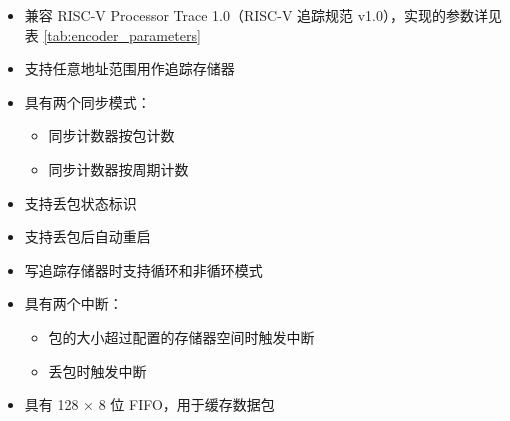 \documentclass[main\_\_CN.tex]{subfiles}
\begin{document}
\begin{itemize}
    \item 兼容 RISC-V Processor Trace 1.0（RISC-V 追踪规范 v1.0），实现的参数详见表 \ref{tab:encoder_parameters}
    \item 支持任意地址范围用作追踪存储器
    \item 具有两个同步模式：
        \begin{itemize}
            \item 同步计数器按包计数
            \item 同步计数器按周期计数
        \end{itemize}
    \item 支持丢包状态标识
    \item 支持丢包后自动重启
    \item 写追踪存储器时支持循环和非循环模式
    \item 具有两个中断：
        \begin{itemize}
            \item 包的大小超过配置的存储器空间时触发中断
            \item 丢包时触发中断
        \end{itemize}
    \item 具有 128 × 8 位 FIFO，用于缓存数据包
\end{itemize}
\end{document}
